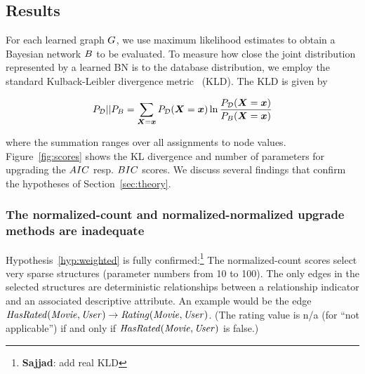 \documentclass[letterpaper]{article}
\begin{document}
\subsection{Results} For each learned graph $G$, we use maximum likelihood estimates to obtain a Bayesian network $B$ to be evaluated. To measure how close the joint distribution represented by a learned BN  is to the database distribution, we employ the standard Kulback-Leibler divergence metric~\cite{Campos2006} (KLD).  The KLD is given by

\begin{equation*} \label{eq:kld}
P_{\mathcal{D}}||P_{B} = \sum_{\boldsymbol{X} = \boldsymbol{x}} P_{\mathcal{D}}(\boldsymbol{X} = \boldsymbol{x})  \ln \frac{P_{\mathcal{D}}(\boldsymbol{X} = \boldsymbol{x})}{P_{B}(\boldsymbol{X} = \boldsymbol{x})}
\end{equation*}


where the summation ranges over all assignments to node values.  Figure~\ref{fig:scores} shows the KL divergence and number of parameters for upgrading  the $AIC$ resp. $BIC$ scores.  We discuss several findings that confirm the hypotheses of Section~\ref{sec:theory}.





\subsubsection{The normalized-count and normalized-normalized upgrade methods are inadequate}
 Hypothesis~\ref{hyp:weighted} is fully confirmed:\footnote{\textbf{Sajjad}: add real KLD} The normalized-count scores select very sparse structures (parameter numbers from 10 to 100).  The only edges in the selected structures  are deterministic relationships between a relationship indicator and an associated descriptive attribute. An example would be the edge $\it{HasRated(Movie,User)} \rightarrow \it{Rating(Movie,User)}$. (The rating value is n/a (for ``not applicable'') if and only if $\it{HasRated(Movie,User)}$ is false.)
 
\end{document}
